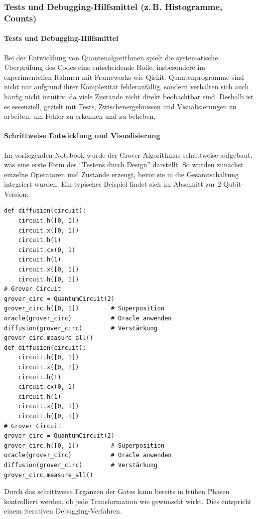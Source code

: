 \clearpage %

\subsubsection{Tests und Debugging-Hilfsmittel (z.\,B. Histogramme, Counts)}


\paragraph*{Tests und Debugging-Hilfsmittel}
\mbox{}

Bei der Entwicklung von Quantenalgorithmen spielt die systematische Überprüfung des Codes eine entscheidende Rolle, insbesondere im experimentellen Rahmen mit Frameworks wie Qiskit. Quantenprogramme sind nicht nur aufgrund ihrer Komplexität fehleranfällig, sondern verhalten sich auch häufig nicht intuitiv, da viele Zustände nicht direkt beobachtbar sind. Deshalb ist es essenziell, gezielt mit Tests, Zwischenergebnissen und Visualisierungen zu arbeiten, um Fehler zu erkennen und zu beheben.

\paragraph*{Schrittweise Entwicklung und Visualisierung}
\mbox{}

Im vorliegenden Notebook wurde der Grover-Algorithmus schrittweise aufgebaut, was eine erste Form des \enquote{Testens durch Design} darstellt. So wurden zunächst einzelne Operatoren und Zustände erzeugt, bevor sie in die Gesamtschaltung integriert wurden. Ein typisches Beispiel findet sich im Abschnitt zur 2-Qubit-Version:
\begin{verbatim}
def diffusion(circuit):
    circuit.h([0, 1])
    circuit.x([0, 1])
    circuit.h(1)
    circuit.cx(0, 1)
    circuit.h(1)
    circuit.x([0, 1])
    circuit.h([0, 1])
# Grover Circuit
grover_circ = QuantumCircuit(2)
grover_circ.h([0, 1])         # Superposition
oracle(grover_circ)           # Oracle anwenden
diffusion(grover_circ)        # Verstärkung
grover_circ.measure_all()
def diffusion(circuit):
    circuit.h([0, 1])
    circuit.x([0, 1])
    circuit.h(1)
    circuit.cx(0, 1)
    circuit.h(1)
    circuit.x([0, 1])
    circuit.h([0, 1])
# Grover Circuit
grover_circ = QuantumCircuit(2)
grover_circ.h([0, 1])         # Superposition
oracle(grover_circ)           # Oracle anwenden
diffusion(grover_circ)        # Verstärkung
grover_circ.measure_all()
\end{verbatim}
Durch das schrittweise Ergänzen der Gates kann bereits in frühen Phasen kontrolliert werden, ob jede Transformation wie gewünscht wirkt. Dies entspricht einem iterativen Debugging-Verfahren.


